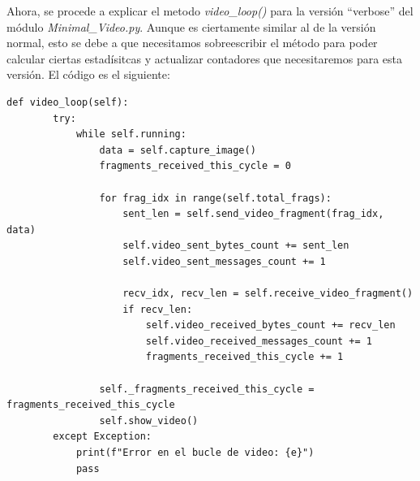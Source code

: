 Ahora, se procede a explicar el metodo \textit{video\_loop()} para la versión ``verbose'' del módulo \textit{Minimal\_Video.py}. Aunque es ciertamente similar al de la versión normal, esto se debe a que necesitamos sobreescribir el método para poder calcular ciertas estadísitcas y actualizar contadores que necesitaremos para esta versión. El código es el siguiente:

\begin{lstlisting}[style=pythonstyle, caption={Método video\_loop() de \textit{Minimal\_Video\_verbose}}, label={lst:video_loop_minimal_video_verbose}]
    def video_loop(self):
        try:
            while self.running:
                data = self.capture_image()
                fragments_received_this_cycle = 0

                for frag_idx in range(self.total_frags):
                    sent_len = self.send_video_fragment(frag_idx, data)
                    self.video_sent_bytes_count += sent_len
                    self.video_sent_messages_count += 1

                    recv_idx, recv_len = self.receive_video_fragment()
                    if recv_len:
                        self.video_received_bytes_count += recv_len
                        self.video_received_messages_count += 1
                        fragments_received_this_cycle += 1

                self._fragments_received_this_cycle = fragments_received_this_cycle
                self.show_video()
        except Exception:
            print(f"Error en el bucle de video: {e}")
            pass
\end{lstlisting}
\vspace{\baselineskip}

